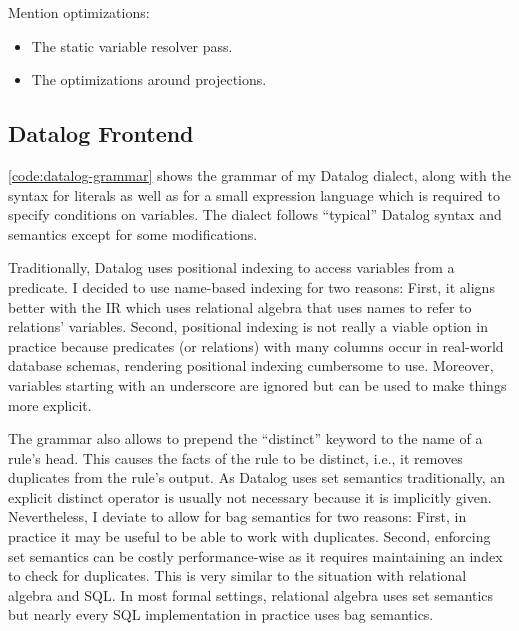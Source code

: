 Mention optimizations:
\begin{itemize}
	\item The static variable resolver pass.
	\item The optimizations around projections.
\end{itemize}

\subsection{Datalog Frontend}\label{sec:datalog-frontend}

\ref{code:datalog-grammar} shows the grammar of my Datalog dialect\footnotemark{},
along with the syntax for literals as well as for a small expression language
which is required to specify conditions on variables.
The dialect follows ``typical'' Datalog syntax and semantics
except for some modifications.


Traditionally, Datalog uses positional indexing to access variables from a
predicate. I decided to use name-based indexing for two reasons:
First, it aligns better with the \ac{IR} which uses relational algebra
that uses names to refer to relations' variables.
Second, positional indexing is not really a viable option in practice because
predicates (or relations) with many columns occur in real-world
database schemas, rendering positional indexing cumbersome to use.
Moreover, variables starting with an underscore are ignored but can be used
to make things more explicit.

The grammar also allows to prepend the ``distinct'' keyword to the name
of a rule's head.
This causes the facts of the rule to be distinct, i.e., it removes duplicates
from the rule's output.
As Datalog uses set semantics traditionally, an explicit distinct operator
is usually not necessary because it is implicitly given.
Nevertheless, I deviate to allow for bag semantics for two reasons:
First, in practice it may be useful to be able to work with duplicates.
Second, enforcing set semantics can be costly performance-wise
as it requires maintaining an index to check for duplicates.
This is very similar to the situation with relational algebra and SQL.
In most formal settings, relational algebra uses set semantics but nearly
every SQL implementation in practice uses bag semantics.

